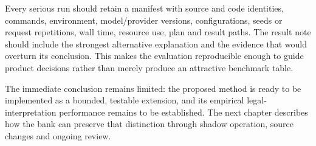Every serious run should retain a manifest with source and code identities,
commands, environment, model/provider versions, configurations, seeds or request
repetitions, wall time, resource use, plan and result paths. The result note should
include the strongest alternative explanation and the evidence that would overturn
its conclusion. This makes the evaluation reproducible enough to guide product
decisions rather than merely produce an attractive benchmark table.

The immediate conclusion remains limited: the proposed method is ready to be
implemented as a bounded, testable extension, and its empirical legal-interpretation
performance remains to be established. The next chapter describes how the bank
can preserve that distinction through shadow operation, source changes and
ongoing review.

